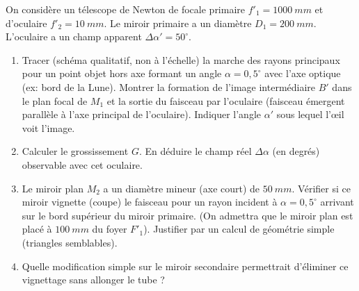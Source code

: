 \documentclass[11pt]{article}
\begin{document}
\begin{exercice}
On considère un télescope de Newton de focale primaire $f'_1 = \SI{1000}{mm}$ et d'oculaire $f'_2 = \SI{10}{mm}$. Le miroir primaire a un diamètre $D_1 = \SI{200}{mm}$. L'oculaire a un champ apparent $\Delta \alpha' = 50^\circ$.
\begin{enumerate}
    \item Tracer (schéma qualitatif, non à l'échelle) la marche des rayons principaux pour un point objet hors axe formant un angle $\alpha = 0,5^\circ$ avec l'axe optique (ex: bord de la Lune). Montrer la formation de l'image intermédiaire $B'$ dans le plan focal de $M_1$ et la sortie du faisceau par l'oculaire (faisceau émergent parallèle à l'axe principal de l'oculaire). Indiquer l'angle $\alpha'$ sous lequel l'œil voit l'image.
    \item Calculer le grossissement $G$. En déduire le champ réel $\Delta \alpha$ (en degrés) observable avec cet oculaire.
    \item Le miroir plan $M_2$ a un diamètre mineur (axe court) de $\SI{50}{mm}$. Vérifier si ce miroir vignette (coupe) le faisceau pour un rayon incident à $\alpha = 0,5^\circ$ arrivant sur le bord supérieur du miroir primaire. (On admettra que le miroir plan est placé à $\SI{100}{mm}$ du foyer $F'_1$). Justifier par un calcul de géométrie simple (triangles semblables).
    \item Quelle modification simple sur le miroir secondaire permettrait d'éliminer ce vignettage sans allonger le tube ?
\end{enumerate}
\end{exercice}
\end{document}
